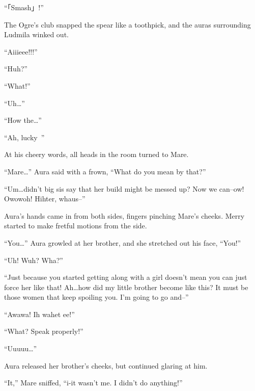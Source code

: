  

“「Smash」!”

 

The Ogre’s club snapped the spear like a toothpick, and the auras surrounding Ludmila winked out.

 

“Aiiieee!!!”

 

“Huh?”

 

“What!”

 

“Uh…”

 

“How the…”

 

“Ah, lucky~”

 

At his cheery words, all heads in the room turned to Mare.

 

“Mare…” Aura said with a frown, “What do you mean by that?”

 

“Um…didn’t big sis say that her build might be messed up? Now we can–ow! Owowoh! Hihter, whaus–”

 

Aura’s hands came in from both sides, fingers pinching Mare’s cheeks. Merry started to make fretful motions from the side.

 

“You…” Aura growled at her brother, and she stretched out his face, “You!”

 

“Uh! Wuh? Wha?”

 

“Just because you started getting along with a girl doesn’t mean you can just force her like that! Ah…how did my little brother become like this? It must be those women that keep spoiling you. I’m going to go and–”

 

“Awawa! Ih wahet ee!”

 

“What? Speak properly!”

 

“Uuuuu…”

 

Aura released her brother’s cheeks, but continued glaring at him.

 

“It,” Mare sniffed, “i-it wasn’t me. I didn’t do anything!”

